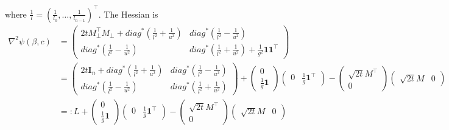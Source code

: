 \documentclass{article}
\begin{document}
where $\frac{1}{l}=(\frac{1}{l_0},\dots,\frac{1}{l_{n-1}})^\top$. The Hessian is
\begin{equation}\label{Hessian}
\begin{aligned}
    \nabla^2\psi(\beta, c) &= \begin{pmatrix}
        2tM_{\perp}^\top M_{\perp}+diag^*\left(\frac{1}{l^2}+\frac{1}{u^2}\right) &diag^*\left(\frac{1}{l^2}-\frac{1}{u^2}\right)\\
        diag^*\left(\frac{1}{l^2}-\frac{1}{u^2}\right)&diag^*\left(\frac{1}{l^2}+\frac{1}{u^2}\right)+\frac{1}{g^2}\mathbf{1}\mathbf{1}^\top
    \end{pmatrix}\\
    &= \begin{pmatrix}
        2t\mathbf{I}_n+diag^*\left(\frac{1}{l^2}+\frac{1}{u^2}\right) &diag^*\left(\frac{1}{l^2}-\frac{1}{u^2}\right)\\
        diag^*\left(\frac{1}{l^2}-\frac{1}{u^2}\right)&diag^*\left(\frac{1}{l^2}+\frac{1}{u^2}\right)
    \end{pmatrix} + \begin{pmatrix}
        0\\
        \frac{1}{g}\mathbf{1}
    \end{pmatrix}\begin{pmatrix}
        0 &  \frac{1}{g}\mathbf{1}^\top
    \end{pmatrix} - \begin{pmatrix}
        \sqrt{2t}M^\top\\
        0
    \end{pmatrix}\begin{pmatrix}
        \sqrt{2t}M & 0
    \end{pmatrix}\\
 & =: L + \begin{pmatrix}
        0\\
        \frac{1}{g}\mathbf{1}
    \end{pmatrix}\begin{pmatrix}
        0 &  \frac{1}{g}\mathbf{1}^\top
    \end{pmatrix} - \begin{pmatrix}
        \sqrt{2t}M^\top\\
        0
    \end{pmatrix}\begin{pmatrix}
        \sqrt{2t}M & 0
    \end{pmatrix}
    \end{aligned}
\end{equation}
\end{document}

